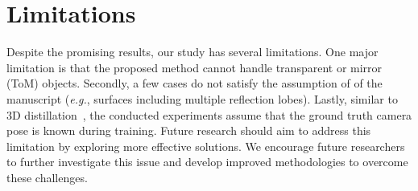 \section{Limitations}
Despite the promising results, our study has several limitations.
One major limitation is that the proposed method cannot handle transparent or mirror (ToM) objects.
Secondly, a few cases do not satisfy the assumption of  of the manuscript (\textit{e.g.}, surfaces including multiple reflection lobes).
Lastly, similar to 3D distillation~\citep{shi20233d}, the conducted experiments assume that the ground truth camera pose is known during training.
Future research should aim to address this limitation by exploring more effective solutions.
We encourage future researchers to further investigate this issue and develop improved methodologies to overcome these challenges.
